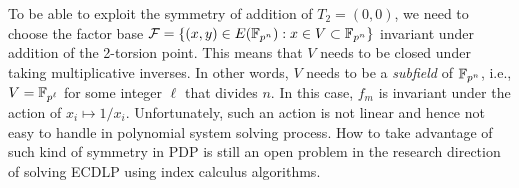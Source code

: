 To be able to exploit the symmetry of addition of $T_2=(0,0)$, we need
to choose the factor base
$\mathcal F=\{(x,y)\in E(\mathbb F_{p^n}):x\in V\subset\mathbb F_{p^n}\}$ invariant
under addition of the 2-torsion point.
%
This means that $V$ needs to be closed under taking multiplicative
inverses.
%
In other words, $V$ needs to be a \emph{subfield} of $\mathbb F_{p^n}$, i.e.,
$V=\mathbb F_{p^\ell}$ for some integer $\ell$ that divides $n$.
%
In this case, $f_m$ is invariant under the action of
$x_i\mapsto 1/x_i$.
%
Unfortunately, such an action is not linear and hence not easy to
handle in polynomial system solving process.
%
How to take advantage of such kind of symmetry in PDP is still an open
problem in the research direction of solving ECDLP using index
calculus algorithms.

